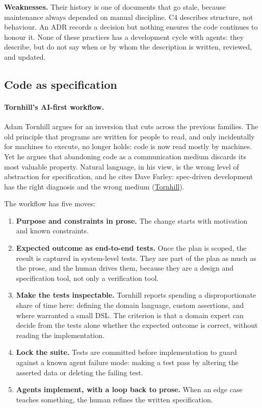 \documentclass[11pt]{article}
\begin{document}
\textbf{Weaknesses.} Their history is one of documents that go stale, because maintenance always depended on manual discipline. C4 describes structure, not behaviour. An ADR records a decision but nothing ensures the code continues to honour it. None of these practices has a development cycle with agents: they describe, but do not say when or by whom the description is written, reviewed, and updated.

\subsection{Code as specification}

\paragraph{Tornhill's AI-first workflow.} Adam Tornhill argues for an inversion that cuts across the previous families. The old principle that programs are written for people to read, and only incidentally for machines to execute, no longer holds: code is now read mostly by machines. Yet he argues that abandoning code as a communication medium discards its most valuable property. Natural language, in his view, is the wrong level of abstraction for specification, and he cites Dave Farley: spec-driven development has the right diagnosis and the wrong medium (\href{https://adamtornhill.substack.com/p/ai-first-workflows-code-as-a-strategic}{Tornhill}).

The workflow has five moves:

\begin{enumerate}[leftmargin=*]
  \item \textbf{Purpose and constraints in prose.} The change starts with motivation and known constraints.
  \item \textbf{Expected outcome as end-to-end tests.} Once the plan is scoped, the result is captured in system-level tests. They are part of the plan as much as the prose, and the human drives them, because they are a design and specification tool, not only a verification tool.
  \item \textbf{Make the tests inspectable.} Tornhill reports spending a disproportionate share of time here: defining the domain language, custom assertions, and where warranted a small DSL. The criterion is that a domain expert can decide from the tests alone whether the expected outcome is correct, without reading the implementation.
  \item \textbf{Lock the suite.} Tests are committed before implementation to guard against a known agent failure mode: making a test pass by altering the asserted data or deleting the failing test.
  \item \textbf{Agents implement, with a loop back to prose.} When an edge case teaches something, the human refines the written specification.
\end{enumerate}
\end{document}
